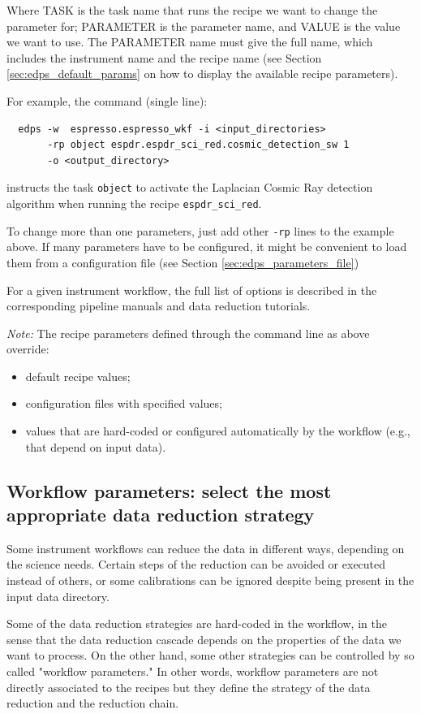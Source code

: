 Where TASK is the task name that runs the recipe we want to change the parameter for; PARAMETER is the parameter name, and VALUE is the value we want to use. The PARAMETER name must give the full name, which includes the instrument name and the recipe name (see Section \ref{sec:edps_default_params} on how to display the available recipe parameters). 

For example, the command (single line):

\begin{verbatim}
  edps -w  espresso.espresso_wkf -i <input_directories> 
       -rp object espdr.espdr_sci_red.cosmic_detection_sw 1
       -o <output_directory>
\end{verbatim}
 
instructs the task {\tt object} to activate the Laplacian Cosmic Ray detection algorithm when running the recipe {\tt espdr\_sci\_red}.

To change more than one parameters, just add other {\tt -rp} lines to the example above. If many parameters have to be configured, it might be convenient to load them from a configuration file (see Section \ref{sec:edps_parameters_file})

For a given instrument workflow, the full list of options is described in the corresponding pipeline manuals and data reduction tutorials.

{\it Note:} The recipe parameters defined through the command line as above override:
\begin{itemize}
    \item default recipe values;
    \item configuration files with specified values;
    \item values that are hard-coded or configured automatically by the workflow (e.g., that depend on input data).
\end{itemize}


\subsection{Workflow parameters: select the most appropriate data reduction strategy}
\label{sec:edps_workflow_parameters}

Some instrument workflows can reduce the data in different ways, depending on the science needs. Certain steps of the reduction can be avoided or executed instead of others, or some calibrations can be ignored despite being present in the input data directory. 

Some of the data reduction strategies are hard-coded in the workflow, in the sense that the data reduction cascade depends on the properties of the data we want to process. On the other hand, some other strategies can be controlled by so called "workflow parameters." In other words, workflow parameters are not directly associated to the recipes but they define the strategy of the data reduction and the reduction chain.

